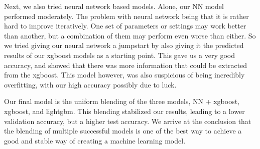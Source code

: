 \documentclass[a4paper, 12pt]{article}
\begin{document}
                Next, we also tried neural network based models. Alone, our NN model performed moderately. The problem with neural network being that it is rather hard to improve iteratively. One set of parameters or settings may work better than another, but a combination of them may perform even worse than either. So we tried giving our neural network a jumpstart by also giving it the predicted results of our xgboost models as a starting point. This gave us a very good accuracy, and showed that there was more information that could be extracted from the xgboost. This model however, was also suspicious of being incredibly overfitting, with our high accuracy possibly due to luck.

                Our final model is the uniform blending of the three models, NN + xgboost, xgboost, and lightgbm. This blending stabilized our results, leading to a lower validation accuracy, but a higher test accuracy.  We arrive at the conclusion that the blending of multiple successful models is one of the best way to achieve a good and stable way of creating a machine learning model.

\vskip 5cm
{}

\end{document}
